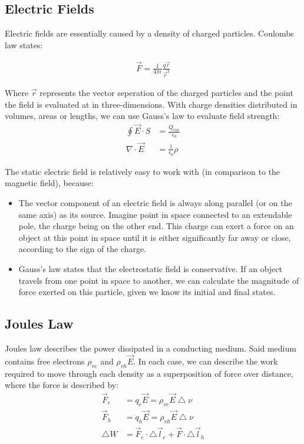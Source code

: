 \documentclass{book}
\begin{document}
\subsection{Electric Fields}

Electric fields are essentially caused by a density of charged particles. Coulombs law states:

\begin{align*}
	\vec{F} = \frac{1}{4\pi \epsilon}\frac{q\vec{r}}{\vec{r}^2}
\end{align*}

Where $\vec{r}$ represents the vector seperation of the charged particles and the point the field is evaluated at in three-dimensions. With charge densities distributed in volumes, areas or lengths, we can use Gauss's law to evaluate field strength:
\begin{align*}
	\oint \vec{E} \cdot S &= \frac{Q_{enc}}{\epsilon_0} \\
	\nabla \cdot \vec{E} &= \frac{1}{\epsilon_0} \rho
\end{align*}

The static electric field is relatively easy to work with (in comparison to the magnetic field), because:
\begin{itemize}
	\item The vector component of an electric field is always along parallel (or on the same axis) as its source. Imagine point in space connected to an extendable pole, the charge being on the other end. This charge can exert a force on an object at this point in space until it is either significantly far away or close, according to the sign of the charge.
	\item Gauss's law states that the electrostatic field is conservative. If an object travels from one point in space to another, we can calculate the magnitude of force exerted on this particle, given we know its initial and final states.
\end{itemize}

\subsection{Joules Law}

Joules law describes the power dissipated in a conducting medium. Said medium contains free electrons $\rho_{ve}$ and $\rho_{vh} \vec{E}$. 
In each case, we can describe the work required to move through each density as a superposition of force over distance, where the force is described by:
\begin{align*}
	\vec{F}_e &= q_e \vec{E} = \rho_{ve}\vec{E}\bigtriangleup \nu \\
	\vec{F}_h &= q_h \vec{E} = \rho_{vh}\vec{E}\bigtriangleup \nu \\
	\bigtriangleup W &= \vec{F}_e \cdot \bigtriangleup \vec{l}_e + \vec{F} \cdot \bigtriangleup\vec{l}_h
\end{align*}
\end{document}
